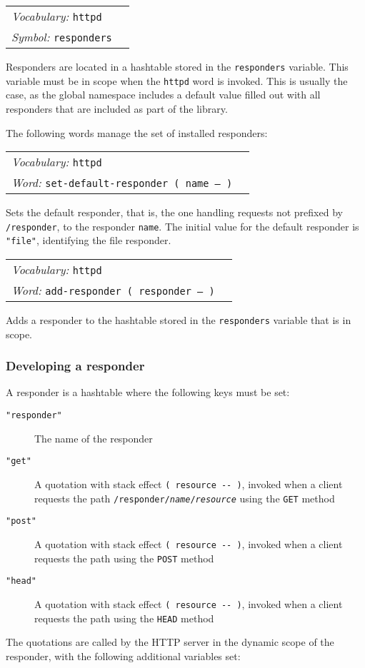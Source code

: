 \documentclass{book}
\newcommand{\vocabulary}[1]{\emph{Vocabulary:} \texttt{#1}&\\}
\newcommand{\ordinaryword}[2]{\index{\texttt{#1}}\emph{Word:} \texttt{#2}&\\}
\newcommand{\symbolword}[1]{\index{\texttt{#1}}\emph{Symbol:} \texttt{#1}&\\}
\newcommand{\wordtable}[1]{


\begin{tabularx}{12cm}{lX}
\hline
#1
\hline
\end{tabularx}

}
\begin{document}
\wordtable{
\vocabulary{httpd}
\symbolword{responders}
}
Responders are located in a hashtable stored in the \verb|responders| variable. This variable must be in scope when the \verb|httpd| word is invoked. This is usually the case, as the global namespace includes a default value filled out with all responders that are included as part of the library.

The following words manage the set of installed responders:

\wordtable{
\vocabulary{httpd}
\ordinaryword{set-default-responder}{set-default-responder ( name -- )}
}
Sets the default responder, that is, the one handling requests not prefixed by \verb|/responder|, to the responder \verb|name|. The initial value for the default responder is \verb|"file"|, identifying the file responder.
\wordtable{
\vocabulary{httpd}
\ordinaryword{add-responder}{add-responder ( responder -- )}
}
Adds a responder to the hashtable stored in the \verb|responders| variable that is in scope.

\subsubsection{Developing a responder}

A responder is a hashtable where the following keys must be set:

\begin{description}
\item[\texttt{"responder"}] The name of the responder
\item[\texttt{"get"}] A quotation with stack effect \verb|( resource -- )|, invoked when a client requests the path \texttt{/responder/\emph{name}/\emph{resource}} using the \texttt{GET} method
\item[\texttt{"post"}] A quotation with stack effect \verb|( resource -- )|, invoked when a client requests the path using the \texttt{POST} method
\item[\texttt{"head"}] A quotation with stack effect \verb|( resource -- )|, invoked when a client requests the path using the \texttt{HEAD} method
\end{description}

The quotations are called by the HTTP server in the dynamic scope of the responder, with the following additional variables set:
\end{document}
